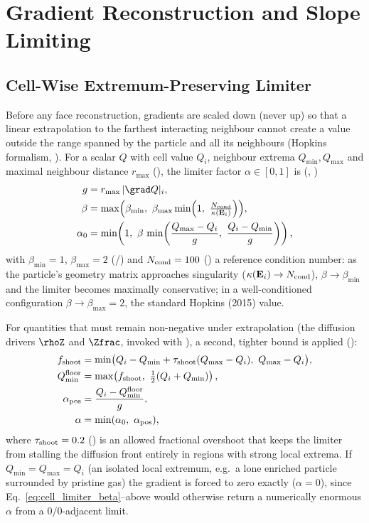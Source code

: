 \section{Gradient Reconstruction and Slope Limiting}
\label{sec:gradients}

\subsection{Cell-Wise Extremum-Preserving Limiter}
Before any face reconstruction, gradients are scaled down (never up) so
that a linear extrapolation to the farthest interacting neighbour cannot
create a value outside the range spanned by the particle and all its
neighbours (Hopkins~\citeyear{Hopkins2015} formalism,
). For a scalar $Q$ with cell value
$Q_i$, neighbour extrema $Q_{\min}, Q_{\max}$ and maximal neighbour
distance $r_{\max}$ (), the limiter factor
$\alpha\in[0,1]$ is (,
)
\begin{align}
  g &= r_{\max}\, |\grad Q|_i , \\
  \beta &= \max\!\Big(\beta_{\min},\ \beta_{\max}\min\!\Big(1,\ \tfrac{N_{\rm cond}}{\kappa(\mathbf E_i)}\Big)\Big) ,
  \label{eq:cell_limiter_beta} \\
  \alpha_0 &= \min\!\left(1,\ \beta \, \min\!\left(\frac{Q_{\max}-Q_i}{g},\ \frac{Q_i - Q_{\min}}{g}\right)\right) ,
\end{align}
with $\beta_{\min}=1$, $\beta_{\max}=2$
(/) and $N_{\rm cond}=100$
() a reference condition number:
as the particle's geometry matrix approaches singularity
($\kappa(\mathbf E_i)\to N_{\rm cond}$), $\beta\to\beta_{\min}$ and the
limiter becomes maximally conservative; in a well-conditioned
configuration $\beta\to\beta_{\max}=2$, the standard Hopkins (2015)
value.

For quantities that must remain non-negative under extrapolation
(the diffusion drivers $\rhoZ$ and $\Zfrac$, invoked with
), a second, tighter bound is applied
():
\begin{align}
  f_{\rm shoot} &= \min\!\big(Q_i - Q_{\min} + \tau_{\rm shoot}(Q_{\max}-Q_i),\ Q_{\max}-Q_i\big) , \\
  Q_{\min}^{\rm floor} &= \max\!\left(f_{\rm shoot},\ \tfrac12(Q_i+Q_{\min})\right) , \\
  \alpha_{\rm pos} &= \frac{Q_i - Q_{\min}^{\rm floor}}{g} , \\
  \alpha &= \min(\alpha_0,\ \alpha_{\rm pos}) ,
\end{align}
where $\tau_{\rm shoot} = 0.2$
() is an allowed
fractional overshoot that keeps the limiter from stalling the diffusion
front entirely in regions with strong local extrema. If
$Q_{\min}=Q_{\max}=Q_i$ (an isolated local extremum, e.g.\ a lone
enriched particle surrounded by pristine gas) the gradient is forced to
zero exactly ($\alpha=0$), since Eq.~\eqref{eq:cell_limiter_beta}--above
would otherwise return a numerically enormous $\alpha$ from a
$0/0$-adjacent limit.

